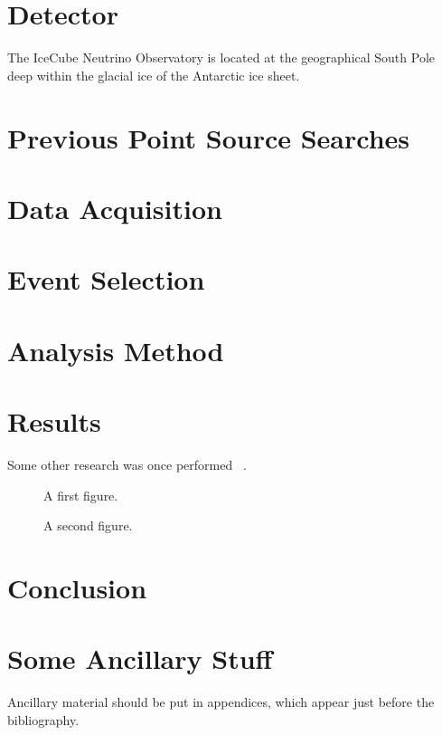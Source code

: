\documentclass{gatech-thesis}
\begin{document}

\chapter{Detector}
The IceCube Neutrino Observatory is located at the geographical South Pole deep within the glacial ice of the Antarctic ice sheet.


\chapter{Previous Point Source Searches}

\chapter{Data Acquisition}

\chapter{Event Selection}

\chapter{Analysis Method}

\chapter{Results}
Some other research was once performed ~\cite{Nobody06}.

\begin{figure}
\caption{A first figure.}
\end{figure}

\begin{figure}
\caption{A second figure.}
\end{figure}
\chapter{Conclusion}


\appendix
\chapter{Some Ancillary Stuff}

Ancillary material should be put in appendices, which 
appear just before the bibliography. 

\begin{postliminary}
{}

\begin{vita}

\end{vita}
\end{postliminary}
\end{document}
